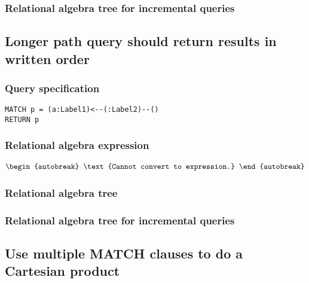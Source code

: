
\subsubsection*{Relational algebra tree for incremental queries}


\subsection{Longer path query should return results in written order}

\subsubsection*{Query specification}

\begin{lstlisting}
MATCH p = (a:Label1)<--(:Label2)--()
RETURN p
\end{lstlisting}

\subsubsection*{Relational algebra expression}

\begin{align*}
\begin{autobreak}
\text{Cannot convert to expression.}
\end{autobreak}
\end{align*}

\subsubsection*{Relational algebra tree}


\subsubsection*{Relational algebra tree for incremental queries}


\subsection{Use multiple MATCH clauses to do a Cartesian product}

